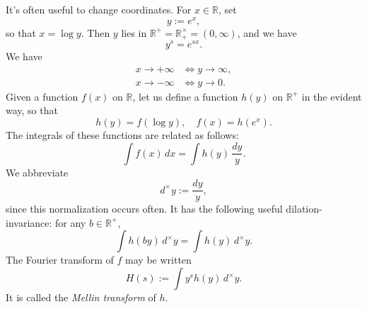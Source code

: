 \documentclass[reqno]{amsart} 
\begin{document}
It's often useful to change coordinates.  For $x \in \mathbb{R}$, set
\begin{equation*}
y := e^x,
\end{equation*}
so that $x = \log y$.  Then $y$ lies in $\mathbb{R}^+ = \mathbb{R}^\times_+ = (0,\infty)$, and we have
\begin{equation*}
y^s = e^{s x}.
\end{equation*}
We have
\begin{align*}
x \rightarrow +\infty &\iff y \rightarrow \infty, \\
x \rightarrow -\infty &\iff y \rightarrow 0.
\end{align*}
Given a function $f(x)$ on $\mathbb{R}$, let us define a function $h(y)$ on $\mathbb{R}^+$ in the evident way, so that
\begin{equation*}
h(y) = f(\log y), \quad f(x) = h(e^x).
\end{equation*}
The integrals of these functions are related as follows:
\begin{equation*}
\int f(x) \, d x = \int h(y) \, \frac{d y}{y}.
\end{equation*}
We abbreviate
\begin{equation*}
  d^\times y := \frac{d y}{y},
\end{equation*}
since this normalization occurs often.  It has the following useful dilation-invariance: for any $b \in \mathbb{R}^+$,
\begin{equation*}
\int h(b y) \,d^\times y = \int h(y) \,d^\times y.
\end{equation*}
The Fourier transform of $f$ may be written
\begin{equation*}
H(s) := \int y^s h(y) \,d^\times y.
\end{equation*}
It is called the \emph{Mellin transform} of $h$.
\end{document}
